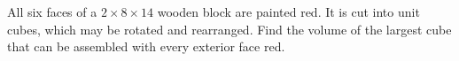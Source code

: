 All six faces of a $2\times8\times14$ wooden block are painted red. It is cut into unit cubes, which may be rotated and rearranged. Find the volume of the largest cube that can be assembled with every exterior face red.
